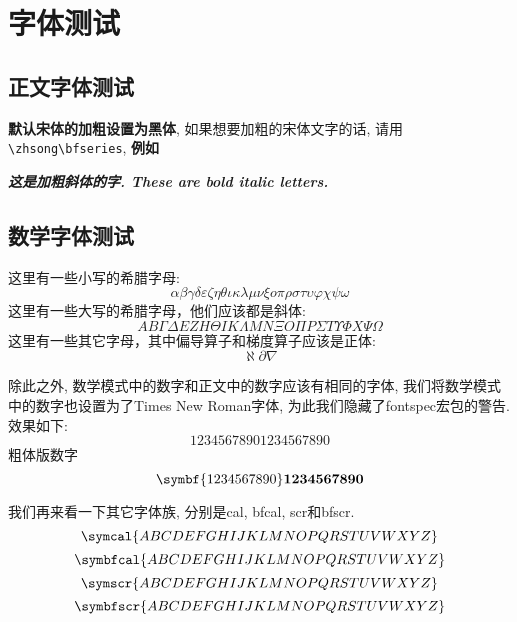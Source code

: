 
\section{字体测试}

\zhlipsum[1]

\subsection{正文字体测试}

{\bfseries 默认宋体的加粗设置为黑体}, 如果想要加粗的宋体文字的话, 请用\verb|\zhsong\bfseries|, {\zhsong\bfseries 例如\zhlipsum[1]}

{\bfseries\itshape 这是加粗斜体的字. These are bold italic letters. \zhlipsum[1]\lipsum[1]}

\subsection{数学字体测试}

这里有一些小写的希腊字母:
\begin{equation}
  \alpha \beta \gamma \delta \varepsilon \zeta \eta \theta \iota \kappa \lambda \mu \nu \xi o \pi \rho \sigma \tau \upsilon \varphi \chi \psi \omega
\end{equation}
这里有一些大写的希腊字母，他们应该都是斜体:
\begin{equation}
  A B \Gamma \Delta E Z H \Theta I K \Lambda M N \Xi O \Pi P \Sigma T \Upsilon \varPhi X \Psi \Omega
\end{equation}
这里有一些其它字母，其中偏导算子和梯度算子应该是正体:
\begin{equation}
  \aleph \partial \nabla
\end{equation}

除此之外, 数学模式中的数字和正文中的数字应该有相同的字体, 我们将数学模式中的数字也设置为了Times New Roman字体, 为此我们隐藏了fontspec宏包的警告. 效果如下:
\begin{equation}
  1234567890\text{1234567890}
\end{equation}
粗体版数字
\begin{equation}
  \symbf{1234567890}\text{\textbf{1234567890}}
\end{equation}

我们再来看一下其它字体族, 分别是cal, bfcal, scr和bfscr.
\begin{equation}
  \symcal{ABCDEFGHIJKLMNOPQRSTUVWXYZ}
\end{equation}
\begin{equation}
  \symbfcal{ABCDEFGHIJKLMNOPQRSTUVWXYZ}
\end{equation}
\begin{equation}
  \symscr{ABCDEFGHIJKLMNOPQRSTUVWXYZ}
\end{equation}
\begin{equation}
  \symbfscr{ABCDEFGHIJKLMNOPQRSTUVWXYZ}
\end{equation}


